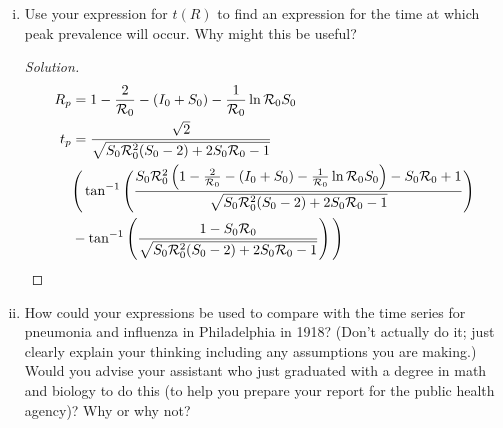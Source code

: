\documentclass[12pt]{article}
\begin{document}
\begin{enumerate}[(a)]
\begin{enumerate}[(i)]
{\begin{proof}[Solution]
{}
\end{proof}
}

\item Use your expression for $t(R)$ to find an expression for the time at which peak prevalence will occur.  Why might this be useful?

{\color{blue}
\begin{proof}[Solution]
{\color{magenta}

\begin{align}
		R_p &= 1- \frac{2}{{\cal R}_0} - (I_0+S_0) - \frac{1}{{\cal R}_0} \ln{{\cal R}_0 S_0}  \\
		t_p &= \frac{\sqrt{2}}{\sqrt{S_0{\cal R}_0^2(S_0-2)+2S_0{\cal R}_0 -1}} \nonumber \\
		&  \Bigg ( \tan ^{-1} \Bigg ( \frac{S_0{\cal R}_0^2 \left ( 1- \frac{2}{{\cal R}_0} - (I_0+S_0) - \frac{1}{{\cal R}_0} \ln{{\cal R}_0 S_0}  \right ) - S_0{\cal R}_0 +1}{\sqrt{S_0{\cal R}_0^2(S_0-2)+2S_0{\cal R}_0 -1}} \Bigg ) \nonumber \\
		&-\tan ^{-1} \left ( \frac{1 - S_0{\cal R}_0 }{\sqrt{S_0{\cal R}_0^2(S_0-2)+2S_0{\cal R}_0 -1}} \right )  \Bigg ) 
	\end{align}

}
\end{proof}
}

\item How could your expressions be used to compare with the time series for pneumonia and influenza in Philadelphia in 1918?  (Don't actually do it; just clearly explain your thinking including any assumptions you are making.)  Would you advise your assistant who just graduated with a degree in math and biology to do this (to help you prepare your report for the public health agency)?  Why or why not?


\end{enumerate}
\end{enumerate}
\end{document}
